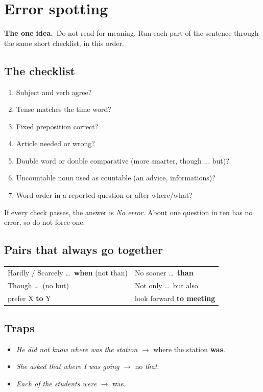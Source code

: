 \documentclass[11pt,a4paper]{article}
\let\oldsection\section
\renewcommand{\section}{\clearpage\oldsection}
\newcommand{\oneidea}[1]{\par\medskip\noindent\begingroup\setlength{\fboxsep}{7pt}%
  \colorbox{codebg}{\parbox{\dimexpr\linewidth-14pt\relax}{\textbf{\color{ember}The one idea.}\ #1}}\endgroup\par\medskip}
\newcommand{\bad}[1]{\textcolor{ember}{#1}}
\newcommand{\good}[1]{\textbf{#1}}
\begin{document}
\section{Error spotting}
\oneidea{Do not read for meaning. Run each part of the sentence through the same short checklist, in this order.}
\subsection*{The checklist}
\begin{enumerate}
\item Subject and verb agree?
\item Tense matches the time word?
\item Fixed preposition correct?
\item Article needed or wrong?
\item Double word or double comparative (\bad{more smarter}, \bad{though ... but})?
\item Uncountable noun used as countable (\bad{an advice}, \bad{informations})?
\item Word order in a reported question or after where/what?
\end{enumerate}
If every check passes, the answer is \emph{No error}. About one question in ten has no error, so do not force one.
\subsection*{Pairs that always go together}
\begin{center}\small\renewcommand{\arraystretch}{1.2}
\begin{tabularx}{\linewidth}{@{}>{\raggedright\arraybackslash}X >{\raggedright\arraybackslash}X@{}}
\toprule
Hardly / Scarcely \ldots\ \good{when} (not than) & No sooner \ldots\ \good{than}\\
Though \ldots\ (no but) & Not only \ldots\ but also\\
prefer X \good{to} Y & look forward \good{to meeting}\\
\bottomrule
\end{tabularx}
\end{center}
\subsection*{Traps}
\begin{itemize}
\item \emph{He did not know where \bad{was} the station} $\rightarrow$ where the station \good{was}.
\item \emph{She asked \bad{that} where I was going} $\rightarrow$ no \emph{that}.
\item \emph{Each of the students \bad{were}} $\rightarrow$ was.
\end{itemize}
\end{document}
